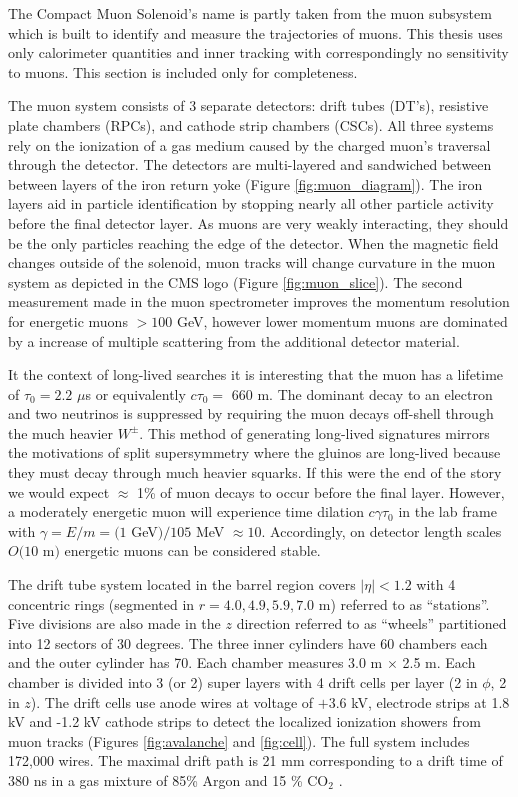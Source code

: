 The Compact Muon Solenoid's name is partly taken from the muon subsystem which is
built to identify and measure the trajectories of muons. This thesis uses
only calorimeter quantities and inner tracking with correspondingly no sensitivity to muons.
This section is included only for completeness.  

The muon system consists of 3 separate detectors: drift tubes (DT's), resistive plate chambers (RPCs), and 
cathode strip chambers (CSCs). All three systems rely on the ionization of a gas medium caused by the charged muon's
traversal through the detector. The detectors are multi-layered and sandwiched between between layers of the iron  return
yoke (Figure \ref{fig:muon_diagram}). The iron layers aid in particle identification by stopping nearly all
 other particle activity before the final detector layer. As  muons are very weakly interacting, they should be the only
particles reaching the edge of the detector. When the magnetic field changes outside of the solenoid, muon tracks
will change curvature in the muon system as depicted in the CMS logo (Figure \ref{fig:muon_slice}). The second measurement
made in the muon spectrometer improves the momentum resolution for energetic muons $>100$ GeV, however lower momentum muons are dominated by a increase of multiple scattering from the additional detector material. 

It the context of long-lived searches it is interesting that the muon has a lifetime of $\tau_0=2.2$ $\mu$s or equivalently $c\tau_0 = $ 660 m. The dominant decay to an electron and two neutrinos  is suppressed by requiring the muon decays off-shell through the much heavier $W^{\pm}$. 
This method of generating long-lived signatures mirrors the motivations of
split supersymmetry where the gluinos are long-lived because they must decay through much heavier squarks.
If this were the end of the story we would expect $\approx$ 1\% of muon decays to occur before the final layer.  However, a moderately energetic muon will experience time dilation $c\gamma\tau_0$ in the lab frame with 
$\gamma = E / m = (1$ GeV$)/ 105$ MeV $\approx 10$. Accordingly, on detector length scales $O(10$ m$)$ energetic muons can be considered stable. 

The drift tube system located in the barrel region covers $|\eta| < 1.2$ with 4 concentric rings (segmented in $r=4.0,4.9,5.9,7.0$ m) referred to as ``stations''. Five divisions are also made in 
the $z$ direction referred to as ``wheels'' partitioned into 12 sectors of 30 degrees.  The three inner cylinders have 
60 chambers each and the outer cylinder has 70.   Each chamber measures 3.0 m $\times$ 2.5 m.
 Each chamber is divided into 3 (or 2) super layers with 4 drift cells per layer 
(2 in $\phi$, 2 in $z$). The drift cells
use anode wires at voltage of $+3.6$ kV, electrode strips at 1.8 kV and -1.2 kV cathode strips  to detect the localized ionization showers from muon tracks (Figures \ref{fig:avalanche} and \ref{fig:cell}). The full system includes 172,000 wires.  The maximal drift path
 is 21 mm corresponding to a drift time of 380 ns in a gas mixture of 85\% Argon and 15 \% CO$_2$ \cite{cmsexpcomplete}.

